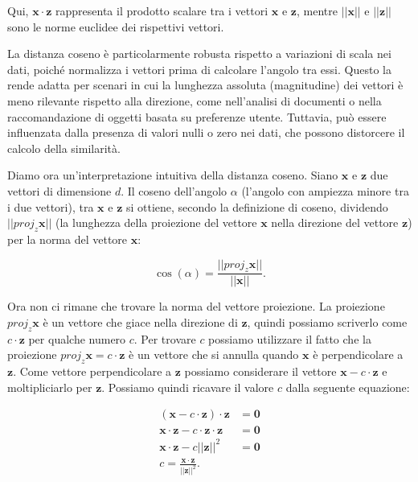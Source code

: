 Qui, $\mathbf{x} \cdot \mathbf{z}$ rappresenta il prodotto scalare tra i 
vettori $\mathbf{x}$ e $\mathbf{z}$, mentre $||\mathbf{x}||$ e $||\mathbf{z}||$ sono 
le norme euclidee dei rispettivi vettori.

La distanza coseno è particolarmente robusta rispetto a variazioni di scala nei dati, 
poiché normalizza i vettori prima di calcolare l'angolo tra essi. Questo la rende adatta 
per scenari in cui la lunghezza assoluta (magnitudine) dei vettori è meno rilevante 
rispetto alla direzione, come nell'analisi di 
documenti o nella raccomandazione di oggetti basata su preferenze utente. Tuttavia, può essere 
influenzata dalla presenza di valori nulli o zero nei dati, che possono distorcere il calcolo della similarità.

Diamo ora un'interpretazione intuitiva della distanza coseno. Siano $\mathbf x$ e $\mathbf z$ 
due vettori di dimensione $d$. Il coseno dell'angolo $\alpha$ (l'angolo con ampiezza minore tra i due vettori),
tra $\mathbf x$ e $\mathbf z$ si ottiene, secondo la definizione di coseno, dividendo $||proj_z \mathbf x||$ 
(la lunghezza della 
proiezione del vettore $\mathbf x$ nella direzione del vettore $\mathbf z$) per la norma del vettore $\mathbf x$:

\begin{equation}
\cos(\alpha) = \frac{||proj_z \mathbf x||}{||\mathbf x||}.
\label{eq:cosine}
\end{equation}

Ora non ci rimane che trovare la norma del vettore proiezione. La proiezione $proj_z \mathbf x$ è
un vettore che giace nella direzione di $\mathbf z$, quindi possiamo scriverlo come
$c \cdot \mathbf z$ per qualche numero $c$. Per trovare $c$ possiamo utilizzare il fatto che la 
proiezione $proj_z \mathbf x = c \cdot \mathbf z$ è un vettore che si annulla quando $\mathbf x$ è perpendicolare
a $\mathbf z$. Come vettore perpendicolare a $\mathbf z$ possiamo considerare il vettore $\mathbf x - c \cdot \mathbf z$ 
e moltipliciarlo per $\mathbf z$. Possiamo quindi ricavare il valore $c$ dalla seguente equazione:

\begin{align}
(\mathbf x - c \cdot \mathbf z) \cdot \mathbf z &= \mathbf 0\\
\mathbf x \cdot \mathbf z - c \cdot \mathbf z \cdot \mathbf z &=\mathbf 0\\
\mathbf x \cdot \mathbf z - c ||\mathbf z||^2 &= \mathbf 0\\
c = \frac{\mathbf x \cdot \mathbf z}{||\mathbf z||^2}.
\label{eq:projection}
\end{align}

